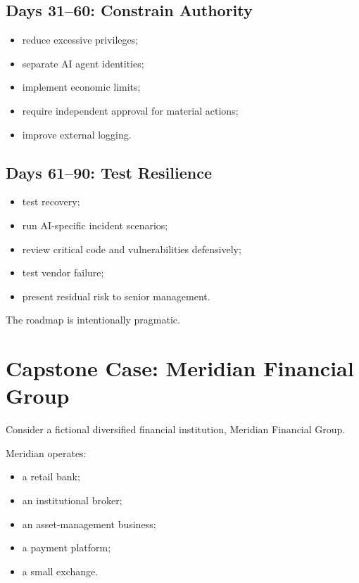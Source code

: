 \subsection{Days 31--60: Constrain Authority}

\begin{itemize}
    \item reduce excessive privileges;
    \item separate AI agent identities;
    \item implement economic limits;
    \item require independent approval for material actions;
    \item improve external logging.
\end{itemize}

\subsection{Days 61--90: Test Resilience}

\begin{itemize}
    \item test recovery;
    \item run AI-specific incident scenarios;
    \item review critical code and vulnerabilities defensively;
    \item test vendor failure;
    \item present residual risk to senior management.
\end{itemize}

The roadmap is intentionally pragmatic.

\section{Capstone Case: Meridian Financial Group}

Consider a fictional diversified financial institution, Meridian Financial Group.

Meridian operates:

\begin{itemize}
    \item a retail bank;
    \item an institutional broker;
    \item an asset-management business;
    \item a payment platform;
    \item a small exchange.
\end{itemize}

